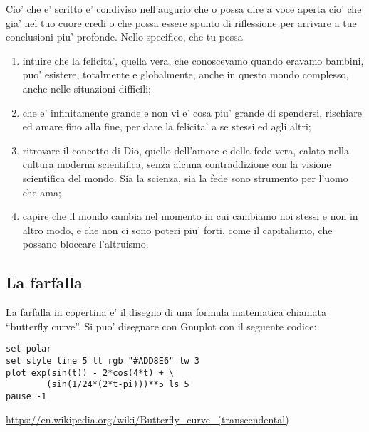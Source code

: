 Cio' che e' scritto e' condiviso nell'augurio che o possa dire a voce aperta cio' che gia' nel tuo cuore credi o che possa essere spunto di riflessione per arrivare a tue conclusioni piu' profonde. Nello specifico, che tu possa 
\begin{enumerate}
    \item intuire che la felicita', quella vera, che conoscevamo quando eravamo bambini, puo' esistere, totalmente e globalmente, anche in questo mondo complesso, anche nelle situazioni difficili;
    \item che e' infinitamente grande e non vi e' cosa piu' grande di spendersi, rischiare ed amare fino alla fine, per dare la felicita' a se stessi ed agli altri;
    \item ritrovare il concetto di Dio, quello dell'amore e della fede vera, calato nella cultura moderna scientifica, senza alcuna contraddizione con la visione scientifica del mondo. Sia la scienza, sia la fede sono strumento per l'uomo che ama;
    \item capire che il mondo cambia nel momento in cui cambiamo noi stessi e non in altro modo, e che non ci sono poteri piu' forti, come il capitalismo, che possano bloccare l'altruismo.
\end{enumerate}


\subsection{La farfalla}

La farfalla in copertina e' il disegno di una formula matematica chiamata ``butterfly curve''. Si puo' disegnare con Gnuplot con il seguente codice:
\begin{verbatim}
set polar
set style line 5 lt rgb "#ADD8E6" lw 3
plot exp(sin(t)) - 2*cos(4*t) + \
        (sin(1/24*(2*t-pi)))**5 ls 5
pause -1
\end{verbatim}
\url{https://en.wikipedia.org/wiki/Butterfly\_curve\_(transcendental)}

